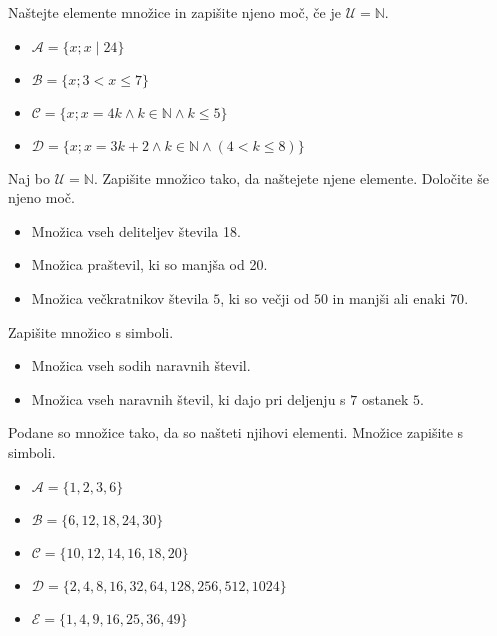     
        \begin{naloga}
            Naštejte elemente množice in zapišite njeno moč, če je $\mathcal{U}=\mathbb{N}$.
            \begin{itemize}
                \item $\mathcal{A}=\{x; x\mid 24\}$
                \item $\mathcal{B}=\{x; 3<x\leq 7\}$
                \item $\mathcal{C}=\{x; x=4k\land k\in\mathbb{N}\land k\leq 5\}$
                \item $\mathcal{D}=\{x; x=3k+2\land k\in\mathbb{N}\land (4<k\leq 8)\}$
            \end{itemize}
        \end{naloga}

        \begin{naloga}
            Naj bo $\mathcal{U}=\mathbb{N}$. Zapišite množico tako, da naštejete njene elemente.
            Določite še njeno moč.
            \begin{itemize}
                \item Množica vseh deliteljev števila 18.
                \item Množica praštevil, ki so manjša od 20.
                \item Množica večkratnikov števila $5$, ki so večji od $50$ in manjši ali enaki $70$.
            \end{itemize}
        \end{naloga}

    

    
        \begin{naloga}
            Zapišite množico s simboli.
            \begin{itemize}
                \item Množica vseh sodih naravnih števil.
                \item Množica vseh naravnih števil, ki dajo pri deljenju s $7$ ostanek $5$.
            \end{itemize}
        \end{naloga}

        \begin{naloga}
            Podane so množice tako, da so našteti njihovi elementi. Množice zapišite s simboli.
            \begin{itemize}
                \item $\mathcal{A}=\{1,2,3,6\}$
                \item $\mathcal{B}=\{6, 12, 18, 24, 30\}$
                \item $\mathcal{C}=\{10, 12, 14, 16, 18, 20\}$
                \item $\mathcal{D}=\{2, 4, 8, 16, 32, 64, 128, 256, 512, 1024\}$
                \item $\mathcal{E}=\{1,4,9,16,25,36,49\}$
            \end{itemize}
        \end{naloga}

